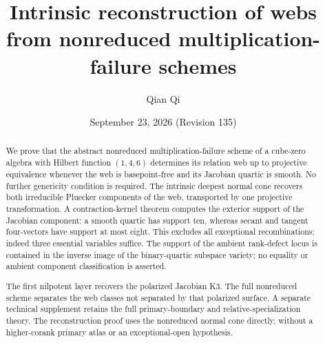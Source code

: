 \title[Intrinsic reconstruction of webs]{Intrinsic reconstruction of webs from nonreduced multiplication-failure schemes}
\author{Qian Qi}
\date{September 23, 2026 \quad (Revision 135)}
\begin{abstract}
We prove that the abstract nonreduced multiplication-failure scheme
of a cube-zero algebra with Hilbert function \((1,4,6)\) determines
its relation web up to projective equivalence whenever the web is
basepoint-free and its Jacobian quartic is smooth.  No further
genericity condition is required.  The intrinsic deepest normal cone
recovers both irreducible Pluecker components of the web, transported
by one projective transformation.  A contraction-kernel theorem
computes the exterior support of the Jacobian component: a smooth
quartic has support ten, whereas secant and tangent four-vectors have
support at most eight.  This excludes all exceptional recombinations;
indeed three essential variables suffice.  The support of the ambient rank-defect locus is contained in the
inverse image of the binary-quartic subspace variety; no equality
or ambient component classification is asserted.

The first nilpotent layer recovers the polarized Jacobian K3.  The
full nonreduced scheme separates the web classes not separated by
that polarized surface.  A separate technical supplement retains the full primary-boundary
and relative-specialization theory.  The reconstruction proof uses
the nonreduced normal cone directly, without a higher-corank primary
atlas or an exceptional-open hypothesis.
\end{abstract}
\maketitle
